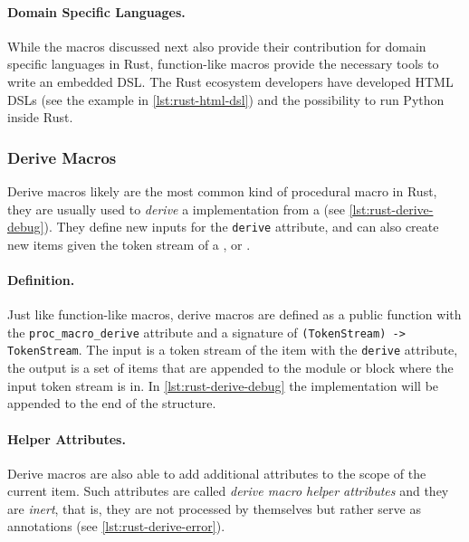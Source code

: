 \paragraph{Domain Specific Languages.}
While the macros discussed next also provide their contribution for domain specific languages in Rust,
function-like macros provide the necessary tools to write an embedded DSL.
The Rust ecosystem developers have developed HTML DSLs \autocite{Wong2021, Stokke2021}
(see the example in \autoref{lst:rust-html-dsl}) and
the possibility to run Python inside Rust\autocite{Fusion2021}.



\subsubsection*{Derive Macros}\label{sec:rust-macros:proc:derive}
Derive macros likely are the most common kind of procedural macro in Rust,
they are usually used to \emph{derive} a  implementation from a  (see \autoref{lst:rust-derive-debug}).
They define new inputs for the \texttt{derive} attribute,
and can also create new items given the token stream of a ,  or .

\paragraph{Definition.}
Just like function-like macros,
derive macros are defined as a public function with the \texttt{proc\_macro\_derive} attribute
and a signature of \texttt{(TokenStream) -> TokenStream}.
The input is a token stream of the item with the \texttt{derive} attribute,
the output is a set of items that are appended to the module or block where the input token stream is in.
In \autoref{lst:rust-derive-debug} the  implementation will be appended to the end of the structure.

\paragraph{Helper Attributes.}
Derive macros are also able to add additional attributes to the scope of the current item.
Such attributes are called \emph{derive macro helper attributes} and they are \emph{inert},
that is, they are not processed by themselves but rather serve as annotations (see \autoref{lst:rust-derive-error}).



